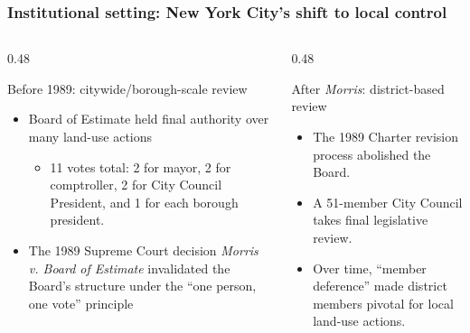 \begin{frame}[t,label=main-result-share]
    \frametitle{Institutional setting: New York City's shift to local control}
    \small

    \begin{columns}[T,totalwidth=\textwidth]
        \begin{column}{0.48\textwidth}
            \begin{block}{Before 1989: citywide/borough-scale review}
                \begin{itemize}
                    \item Board of Estimate held final authority over many land-use actions
                    \begin{itemize}
                        \item 11 votes total: 2 for mayor, 2 for comptroller, 2 for City Council President, and 1 for each borough president.
                    \end{itemize}
                    \item The 1989 Supreme Court decision \textit{Morris v. Board of Estimate} invalidated the Board's structure under the ``one person, one vote'' principle                 \end{itemize}
            \end{block}
        \end{column}
        \begin{column}{0.48\textwidth}
            \begin{block}{After \textit{Morris}: district-based review}
                \begin{itemize}
                    \item The 1989 Charter revision process abolished the Board.
                    \item A 51-member City Council takes final legislative review.
                    \item Over time, ``member deference'' made district members pivotal for local land-use actions.
                \end{itemize}
            \end{block}
        \end{column}
    \end{columns}

\end{frame}

